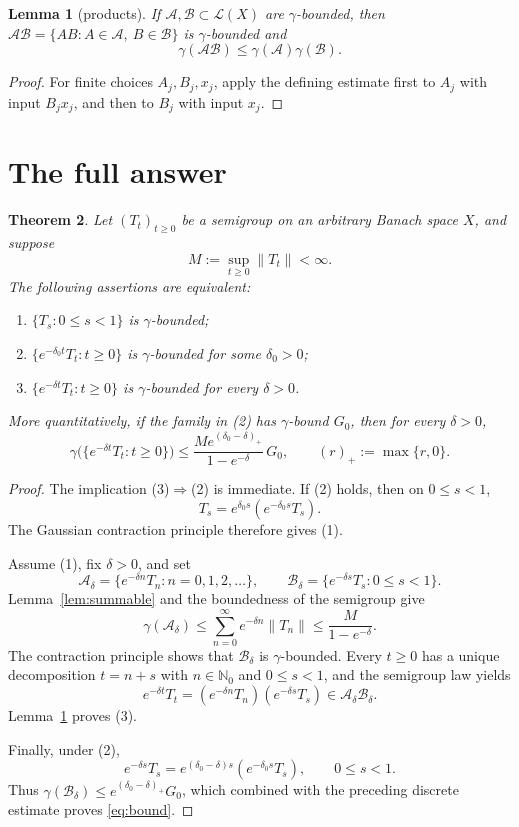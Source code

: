 \documentclass[11pt]{article}
\newtheorem{theorem}{Theorem}
\newtheorem{lemma}[theorem]{Lemma}
\newcommand{\cL}{\mathcal L}
\begin{document}
\begin{lemma}[products]\label{lem:products}
If $\mathscr A,\mathscr B\subset\cL(X)$ are $\gamma$-bounded, then
$\mathscr A\mathscr B=\{AB:A\in\mathscr A,\ B\in\mathscr B\}$ is
$\gamma$-bounded and
\[
 \gamma(\mathscr A\mathscr B)
 \leq\gamma(\mathscr A)\gamma(\mathscr B).
\]
\end{lemma}

\begin{proof}
For finite choices $A_j,B_j,x_j$, apply the defining estimate first to
$A_j$ with input $B_jx_j$, and then to $B_j$ with input $x_j$.
\end{proof}

\section{The full answer}

\begin{theorem}\label{thm:main}
Let $(T_t)_{t\geq0}$ be a semigroup on an arbitrary Banach space $X$, and
suppose
\[
 M:=\sup_{t\geq0}\|T_t\|<\infty.
\]
The following assertions are equivalent:
\begin{enumerate}
\item $\{T_s:0\leq s<1\}$ is $\gamma$-bounded;
\item $\{e^{-\delta_0t}T_t:t\geq0\}$ is $\gamma$-bounded for some
      $\delta_0>0$;
\item $\{e^{-\delta t}T_t:t\geq0\}$ is $\gamma$-bounded for every
      $\delta>0$.
\end{enumerate}
More quantitatively, if the family in (2) has $\gamma$-bound $G_0$, then for
every $\delta>0$,
\begin{equation}\label{eq:bound}
 \gamma\bigl(\{e^{-\delta t}T_t:t\geq0\}\bigr)
 \leq \frac{M e^{(\delta_0-\delta)_+}}{1-e^{-\delta}}\,G_0,
 \qquad (r)_+:=\max\{r,0\}.
\end{equation}
\end{theorem}

\begin{proof}
The implication (3)$\Rightarrow$(2) is immediate.  If (2) holds, then on
$0\leq s<1$,
\[
 T_s=e^{\delta_0s}(e^{-\delta_0s}T_s).
\]
The Gaussian contraction principle therefore gives (1).

Assume (1), fix $\delta>0$, and set
\[
 \mathscr A_\delta=\{e^{-\delta n}T_n:n=0,1,2,\ldots\},
 \qquad
 \mathscr B_\delta=\{e^{-\delta s}T_s:0\leq s<1\}.
\]
Lemma~\ref{lem:summable} and the boundedness of the semigroup give
\[
 \gamma(\mathscr A_\delta)
 \leq\sum_{n=0}^\infty e^{-\delta n}\|T_n\|
 \leq\frac{M}{1-e^{-\delta}}.
\]
The contraction principle shows that $\mathscr B_\delta$ is
$\gamma$-bounded.  Every $t\geq0$ has a unique decomposition $t=n+s$ with
$n\in\mathbb N_0$ and $0\leq s<1$, and the semigroup law yields
\[
 e^{-\delta t}T_t=(e^{-\delta n}T_n)(e^{-\delta s}T_s)
 \in\mathscr A_\delta\mathscr B_\delta.
\]
Lemma~\ref{lem:products} proves (3).

Finally, under (2),
\[
 e^{-\delta s}T_s=e^{(\delta_0-\delta)s}(e^{-\delta_0s}T_s),
 \qquad 0\leq s<1.
\]
Thus $\gamma(\mathscr B_\delta)\leq e^{(\delta_0-\delta)_+}G_0$,
which combined with the preceding discrete estimate proves
\eqref{eq:bound}.
\end{proof}
\end{document}
